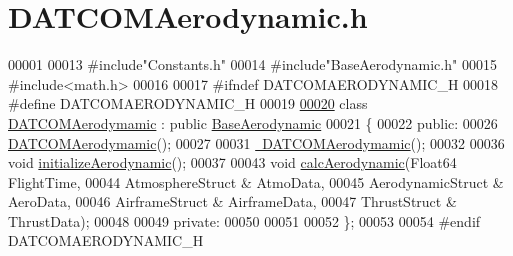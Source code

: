 \hypertarget{_d_a_t_c_o_m_aerodynamic_8h_source}{}\section{D\+A\+T\+C\+O\+M\+Aerodynamic.\+h}
\label{_d_a_t_c_o_m_aerodynamic_8h_source}

\begin{DoxyCode}
00001 
00013 \textcolor{preprocessor}{#include"Constants.h"}
00014 \textcolor{preprocessor}{#include"BaseAerodynamic.h"}
00015 \textcolor{preprocessor}{#include<math.h>}
00016 
00017 \textcolor{preprocessor}{#ifndef DATCOMAERODYNAMIC\_H}
00018 \textcolor{preprocessor}{#define DATCOMAERODYNAMIC\_H}
00019 
\hyperlink{group___aerodynamic}{00020} \textcolor{keyword}{class }\hyperlink{group___aerodynamic_class_d_a_t_c_o_m_aerodymamic}{DATCOMAerodymamic} : \textcolor{keyword}{public} \hyperlink{group___aerodynamic_class_base_aerodynamic}{BaseAerodynamic}
00021 \{
00022 \textcolor{keyword}{public}:
00026     \hyperlink{group___aerodynamic_a03d01a72cf389483e03e2bf6cce33299}{DATCOMAerodymamic}();
00027 
00031     \hyperlink{group___aerodynamic_a3619e38867cad4b0c8b06a939281a74e}{~DATCOMAerodymamic}();
00032 
00036     \textcolor{keywordtype}{void} \hyperlink{group___aerodynamic_ad3c279c14de819e19e443568d7d46aff}{initializeAerodynamic}();
00037 
00043     \textcolor{keywordtype}{void} \hyperlink{group___aerodynamic_a2c31940a25ec9396657d701ef3004327}{calcAerodynamic}(Float64 FlightTime,
00044                         AtmosphereStruct & AtmoData,
00045                         AerodynamicStruct & AeroData,
00046                         AirframeStruct & AirframeData,
00047                         ThrustStruct & ThrustData);
00048 
00049 \textcolor{keyword}{private}:
00050 
00051 
00052 \};
00053 
00054 \textcolor{preprocessor}{#endif DATCOMAERODYNAMIC\_H}
\end{DoxyCode}
